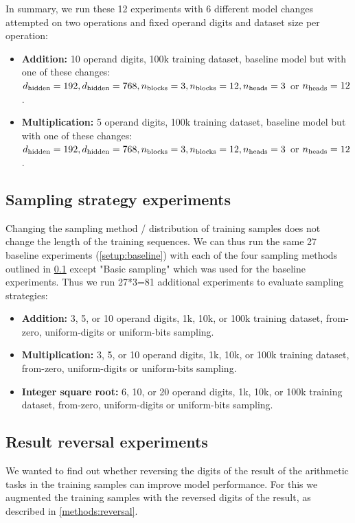 In summary, we run these 12 experiments with 6 different model changes attempted on two operations and fixed operand digits and dataset size per operation:

\begin{itemize}
	\item \textbf{Addition:} 10 operand digits, 100k training dataset, baseline model but with one of these changes: ${d_\textrm{hidden}}=192, {d_\textrm{hidden}}=768, {n_\textrm{blocks}}=3, {n_\textrm{blocks}}=12, {n_\textrm{heads}}=3$ or ${n_\textrm{heads}}=12$.
	\item \textbf{Multiplication:} 5 operand digits, 100k training dataset, baseline model but with one of these changes: ${d_\textrm{hidden}}=192, {d_\textrm{hidden}}=768, {n_\textrm{blocks}}=3, {n_\textrm{blocks}}=12, {n_\textrm{heads}}=3$ or ${n_\textrm{heads}}=12$.
\end{itemize}


\subsection{Sampling strategy experiments}
\label{setup:sampling}

Changing the sampling method / distribution of training samples does not change the length of the training sequences. We can thus run the same 27 baseline experiments (\cref{setup:baseline}) with each of the four sampling methods outlined in \cref{setup:sampling} except "Basic sampling" which was used for the baseline experiments. Thus we run 27*3=81 additional experiments to evaluate sampling strategies:

\begin{itemize}
	\item \textbf{Addition:} 3, 5, or 10 operand digits, 1k, 10k, or 100k training dataset, from-zero, uniform-digits or uniform-bits sampling.
	\item \textbf{Multiplication:} 3, 5, or 10 operand digits, 1k, 10k, or 100k training dataset, from-zero, uniform-digits or uniform-bits sampling.
	\item \textbf{Integer square root:} 6, 10, or 20 operand digits, 1k, 10k, or 100k training dataset, from-zero, uniform-digits or uniform-bits sampling.
\end{itemize}



\subsection{Result reversal experiments}
\label{setup:reversal}

We wanted to find out whether reversing the digits of the result of the arithmetic tasks in the training samples can improve model performance. For this we augmented the training samples with the reversed digits of the result, as described in \cref{methods:reversal}.


